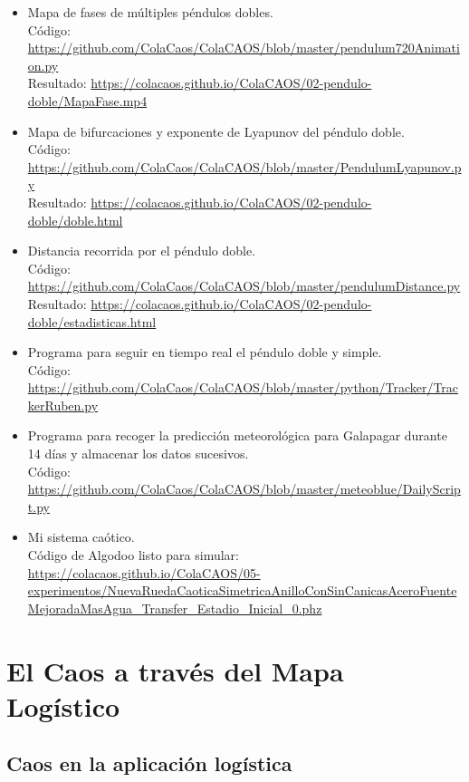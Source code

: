 \documentclass[
  10pt,
  a4paper,
  DIV=11,
  numbers=noendperiod,
  open=any]{scrreprt}
\numberwithin{equation}{chapter}
\numberwithin{equation}{section}
\renewcommand{\[}{\begin{equation}}
\renewcommand{\]}{\end{equation}}
\begin{document}
\begin{itemize}
\item
  Mapa de fases de múltiples péndulos dobles.\\
  Código: \url{https://github.com/ColaCaos/ColaCAOS/blob/master/pendulum720Animation.py}\\
  Resultado: \url{https://colacaos.github.io/ColaCAOS/02-pendulo-doble/MapaFase.mp4}

\item
  Mapa de bifurcaciones y exponente de Lyapunov del péndulo doble.\\
  Código: \url{https://github.com/ColaCaos/ColaCAOS/blob/master/PendulumLyapunov.py}\\
  Resultado: \url{https://colacaos.github.io/ColaCAOS/02-pendulo-doble/doble.html}

\item
  Distancia recorrida por el péndulo doble.\\
  Código: \url{https://github.com/ColaCaos/ColaCAOS/blob/master/pendulumDistance.py}\\
  Resultado: \url{https://colacaos.github.io/ColaCAOS/02-pendulo-doble/estadisticas.html}

\item
  Programa para seguir en tiempo real el péndulo doble y simple.\\
  Código: \url{https://github.com/ColaCaos/ColaCAOS/blob/master/python/Tracker/TrackerRuben.py}

\item
  Programa para recoger la predicción meteorológica para Galapagar durante 14 días y almacenar los datos sucesivos.\\
  Código: \url{https://github.com/ColaCaos/ColaCAOS/blob/master/meteoblue/DailyScript.py}

\item
  Mi sistema caótico.\\
  Código de Algodoo listo para simular: \url{https://colacaos.github.io/ColaCAOS/05-experimentos/NuevaRuedaCaoticaSimetricaAnilloConSinCanicasAceroFuenteMejoradaMasAgua_Transfer_Estadio_Inicial_0.phz}
\end{itemize}


\part{El Caos a través del Mapa Logístico}


\chapter{Caos en la aplicación logística}\label{caos}
\end{document}
